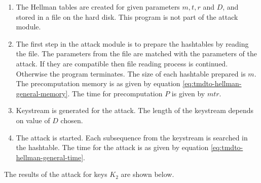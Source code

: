 \begin{enumerate}
\item The Hellman tables are created for given parameters $m,t,r$ and $D$, and stored in a file on the hard disk. This program is not part of the attack module.
\item The first step in the attack module is to prepare the hashtables by reading the file. The parameters from the file are matched with the parameters of the attack. If they are compatible then file reading process is continued. Otherwise the program terminates. The size of each hashtable prepared is $m$. The precomputation memory is as given by equation \ref{eq:tmdto-hellman-general-memory}. The time for precomputation $P$ is given by $mtr$.
\item Keystream is generated for the attack. The length of the keystream depends on value of $D$ chosen.
\item The attack is started. Each subsequence from the keystream is searched in the hashtable. The time for the attack is as given by equation \ref{eq:tmdto-hellman-general-time}. 
\end{enumerate}

The results of the attack for keys $K_2$ are shown below. 

